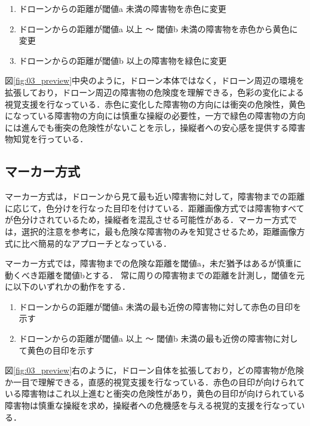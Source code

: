 \documentclass[submit]{ipsj}
\begin{document}
\begin{enumerate}
	\item ドローンからの距離が閾値a 未満の障害物を赤色に変更
    
  \item ドローンからの距離が閾値a 以上 〜 閾値b 未満の障害物を赤色から黄色に変更
    
  \item ドローンからの距離が閾値b 以上の障害物を緑色に変更
\end{enumerate}

図\ref{fig:03_preview}中央のように，ドローン本体ではなく，ドローン周辺の環境を拡張しており，ドローン周辺の障害物の危険度を理解できる，色彩の変化による視覚支援を行なっている．赤色に変化した障害物の方向には衝突の危険性，黄色になっている障害物の方向には慎重な操縦の必要性，一方で緑色の障害物の方向には進んでも衝突の危険性がないことを示し，操縦者への安心感を提供する障害物知覚を行っている．



\subsection{マーカー方式}
マーカー方式は，ドローンから見て最も近い障害物に対して，障害物までの距離に応じて，色分けを行なった目印を付けている．距離画像方式では障害物すべてが色分けされているため，操縦者を混乱させる可能性がある．マーカー方式では，選択的注意を参考に，最も危険な障害物のみを知覚させるため，距離画像方式に比べ簡易的なアプローチとなっている．
\par
マーカー方式では，障害物までの危険な距離を閾値a，未だ猶予はあるが慎重に動くべき距離を閾値bとする．
常に周りの障害物までの距離を計測し，閾値を元に以下のいずれかの動作をする．

\begin{enumerate}
	\item ドローンからの距離が閾値a 未満の最も近傍の障害物に対して赤色の目印を示す
    
    \item ドローンからの距離が閾値a 以上 〜 閾値b 未満の最も近傍の障害物に対して黄色の目印を示す
\end{enumerate}

図\ref{fig:03_preview}右のように，ドローン自体を拡張しており，どの障害物が危険か一目で理解できる，直感的視覚支援を行なっている．赤色の目印が向けられている障害物はこれ以上進むと衝突の危険性があり，黄色の目印が向けられている障害物は慎重な操縦を求め，操縦者への危機感を与える視覚的支援を行なっている．
\end{document}
